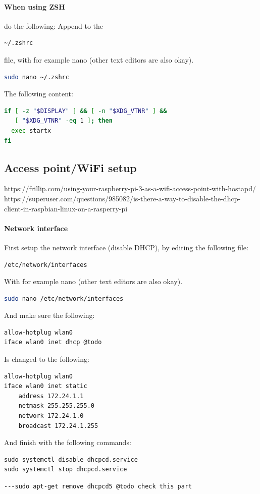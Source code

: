 \documentclass[11pt]{report}
\begin{document}
			\paragraph{When using ZSH} do the following:
				Append to the
				\begin{lstlisting}[language=sh]
~/.zshrc
				\end{lstlisting}
				file, with for example nano (other text editors are also okay).
				\begin{lstlisting}[language=sh]
sudo nano ~/.zshrc
				\end{lstlisting}
				The following content:
				\begin{lstlisting}[language=sh]
if [ -z "$DISPLAY" ] && [ -n "$XDG_VTNR" ] && 
   [ "$XDG_VTNR" -eq 1 ]; then
  exec startx
fi
				\end{lstlisting}
		\subsection{Access point/WiFi setup}
https://frillip.com/using-your-raspberry-pi-3-as-a-wifi-access-point-with-hostapd/
https://superuser.com/questions/985082/is-there-a-way-to-disable-the-dhcp-client-in-raspbian-linux-on-a-rasperry-pi

			\paragraph{Network interface} First setup the network interface (disable DHCP), by editing the following file:
				\begin{lstlisting}[language=sh]
/etc/network/interfaces
				\end{lstlisting}
				With for example nano (other text editors are also okay).
				\begin{lstlisting}[language=sh]
sudo nano /etc/network/interfaces
				\end{lstlisting}
				And make sure the following:
				\begin{lstlisting}
allow-hotplug wlan0  
iface wlan0 inet dhcp @todo
				\end{lstlisting}
				Is changed to the following:
				\begin{lstlisting}
allow-hotplug wlan0  
iface wlan0 inet static  
    address 172.24.1.1
    netmask 255.255.255.0
    network 172.24.1.0
    broadcast 172.24.1.255
				\end{lstlisting}
				And finish with the following commands:
				\begin{lstlisting}
sudo systemctl disable dhcpcd.service
sudo systemctl stop dhcpcd.service
				\end{lstlisting}
				\begin{lstlisting}
---sudo apt-get remove dhcpcd5 @todo check this part
				\end{lstlisting}
\end{document}
